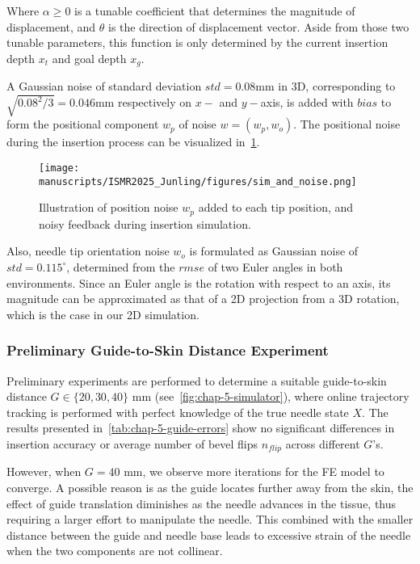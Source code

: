 Where $\alpha \geq 0$ is a tunable coefficient that determines the magnitude of displacement, and $\theta$ is the direction of displacement vector. Aside from those two tunable parameters, this function is only determined by the current insertion depth $x_t$ and goal depth $x_g$.

A Gaussian noise of standard deviation $std = 0.08$mm in 3D, corresponding to $\sqrt{0.08^2 / 3} = 0.046$mm respectively on $x-$ and $y-$axis, is added with $bias$ to form the positional component $w_p$ of noise $w = (w_p, w_o)$. The positional noise during the insertion process can be visualized in~\cref{fig:chap-5-needle-sensor-scatter}.

\begin{figure}[h]
  \centering
  \texttt{[image: manuscripts/ISMR2025\_Junling/figures/sim\_and\_noise.png]}
  \caption{Illustration of position noise $w_p$ added to each tip position, and noisy feedback during insertion simulation.} 
  \label{fig:chap-5-needle-sensor-scatter}
\end{figure}

Also, needle tip orientation noise $w_o$ is formulated as Gaussian noise of $std = 0.115^\circ$, determined from the $rmse$ of two Euler angles in both environments. Since an Euler angle is the rotation with respect to an axis, its magnitude can be approximated as that of a 2D projection from a 3D rotation, which is the case in our 2D simulation.

\subsubsection{Preliminary Guide-to-Skin Distance Experiment}
\label{sec:chap-5-preliminary}

Preliminary experiments are performed to determine a suitable guide-to-skin distance $G \in \{20, 30, 40\}$ mm (see~\cref{fig:chap-5-simulator}), where online trajectory tracking is performed with perfect knowledge of the true needle state $X$. The results presented in~\cref{tab:chap-5-guide-errors} show no significant differences in insertion accuracy or average number of bevel flips $n_{flip}$ across different $G$'s. 

However, when $G = 40$ mm, we observe more iterations for the FE model to converge. A possible reason is as the guide locates further away from the skin, the effect of guide translation diminishes as the needle advances in the tissue, thus requiring a larger effort to manipulate the needle. This combined with the smaller distance between the guide and needle base leads to excessive strain of the needle when the two components are not collinear.

